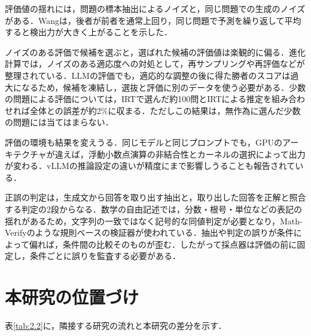 評価値の揺れには，問題の標本抽出によるノイズと，同じ問題での生成のノイズがある．Wang\cite{wang2025noises}は，後者が前者を通常上回り，同じ問題で予測を繰り返して平均すると検出力が大きく上がることを示した．

ノイズのある評価で候補を選ぶと，選ばれた候補の評価値は楽観的に偏る．進化計算では，ノイズのある適応度への対処として，再サンプリングや再評価などが整理されている\cite{jin2005evolutionary,rakshit2017noisy}．LLMの評価でも，適応的な調整の後に得た勝者のスコアは過大になるため，候補を凍結し，選抜と評価に別のデータを使う必要がある\cite{xu2026siren}．少数の問題による評価については，IRTで選んだ約100問とIRTによる推定を組み合わせれば全体との誤差が約2\%に収まる\cite{polo2024tinybenchmarks}．ただしこの結果は，無作為に選んだ少数の問題には当てはまらない．

評価の環境も結果を変えうる．同じモデルと同じプロンプトでも，GPUのアーキテクチャが違えば，浮動小数点演算の非結合性とカーネルの選択によって出力が変わる\cite{cooper2026nondeterminism}．vLLMの推論設定の違いが精度にまで影響しうることも報告されている\cite{zine2026attention}．

正誤の判定は，生成文から回答を取り出す抽出と，取り出した回答を正解と照合する判定の2段からなる．数学の自由記述では，分数・根号・単位などの表記の揺れがあるため，文字列の一致ではなく記号的な同値判定が必要となり，Math-Verify\cite{kydlicek2025mathverify}のような規則ベースの検証器が使われている．抽出や判定の誤りが条件によって偏れば，条件間の比較そのものが歪む．したがって採点器は評価の前に固定し，条件ごとに誤りを監査する必要がある．

\section{本研究の位置づけ}
\label{sec:2.7}

表\ref{tab:2.2}に，隣接する研究の流れと本研究の差分を示す．

